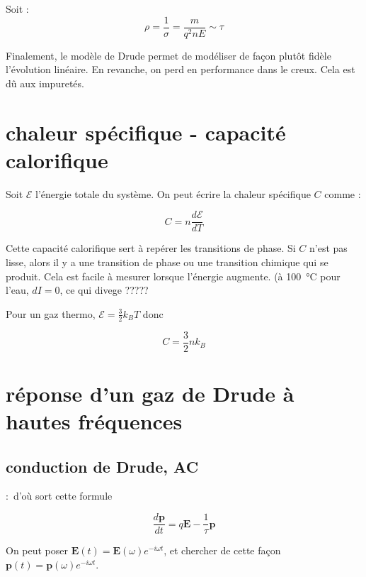 Soit :
\begin{equation}
\rho = \frac{1}{\sigma} = \frac{m}{q^2nE} \sim \tau
\end{equation}

Finalement, le modèle de Drude permet de modéliser de façon plutôt fidèle l'évolution linéaire.
En revanche, on perd en performance dans le creux. Cela est dû aux impuretés.

\section{chaleur spécifique - capacité calorifique}

Soit $\mathcal{E}$ l'énergie totale du système. On peut écrire la chaleur spécifique $C$ comme :

\begin{equation}
C = n \frac{d\mathcal{E}}{dT}
\end{equation}

Cette capacité calorifique sert à repérer les transitions de phase. Si $C$ n'est pas lisse, alors il y a une transition de phase ou une transition chimique qui se produit. Cela est facile à mesurer lorsque l'énergie augmente. (à \SI{100}{\celsius} pour l'eau, $dI = 0$, ce qui divege ?????\TODO

Pour un gaz thermo, $\mathcal{E} = \frac{3}{2}k_BT$ donc

\begin{equation}
C = \frac{3}{2} n k_B
\end{equation}



\section{réponse d'un gaz de Drude à hautes fréquences}

\subsection{conduction de Drude, AC}

\TODO : d'où sort cette formule

\begin{equation}
\frac{d\mathbf{p}}{dt} = q\mathbf{E} - \frac{1}{\tau} \mathbf{p}
\label{eq:drudechampelec}
\end{equation}

On peut poser $\mathbf{E}(t) = \mathbf{E}(\omega) e^{-i\omega t}$, et chercher de cette façon $\mathbf{p}(t) = \mathbf{p}(\omega) e^{-i\omega t}$.

